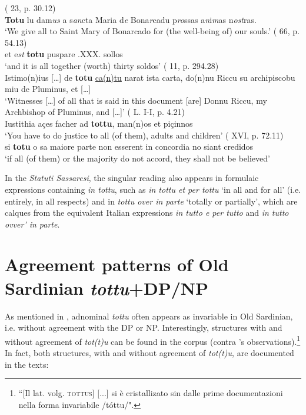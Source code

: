 \documentclass[output=paper,colorlinks,citecolor=brown]{langscibook}
\begin{document}
\ea\label{ex:men27}
\ea\label{ex:men27a}( 23, p. 30.12)\\
 \textbf{Totu} lu dam\textit{us} a s\textit{an}cta Maria d\textit{e} Bona\textit{r}cadu p\textit{ro}ssas a\textit{n}i\textit{m}as n\textit{ost}ras.\\
‘We give all to Saint Mary of Bonarcado for (the well-being of) our souls.’
\ex\label{ex:men27b}( 66, p. 54.13)\\
 et e\textit{st} \textbf{totu} puspare .XXX. sollos\\
‘and it is all together (worth)  thirty soldos’
\ex\label{ex:men27c}( 11, p. 294.28)\\
 Istimo(n)ius […] de \textbf{totu} \ul{ca(n)tu} narat ista carta, do(n)nu Riccu su archipiscobu miu de Pluminus, et […]\\
‘Witnesses […] of all that is said in this document [are] Donnu Riccu, my Archbishop of Pluminus, and […]’
\ex\label{ex:men27d}(  L. I-I, p.  4.21)\\
 Iustithia açes facher ad \textbf{tottu}, man(n)os et piçinnos\\
‘You have to do justice to all (of them), adults and children’
\ex\label{ex:men27e}( XVI, p. 72.11)\\
 si \textbf{totu} o sa maiore parte non esserent in concordia no siant credidos\\
‘if all (of them) or the majority do not accord, they shall not be believed’
\z
\z

In the \textit{Statuti Sassaresi}, the singular reading also appears in formulaic expressions containing \textit{in tottu}, such as \textit{in tottu et per tottu} ‘in all and for all’ (i.e. entirely, in all respects) and in \textit{tottu over in parte} ‘totally or partially’, which are calques from the equivalent Italian expressions \textit{in tutto e per tutto} and \textit{in tutto ovver’ in parte}. 


\section{Agreement patterns of Old Sardinian \textit{tottu}+DP/NP}\label{sec:men5}

As mentioned in , adnominal \textit{tottu} often appears as invariable in Old Sardinian, i.e. without agreement with the DP or NP. Interestingly, structures with and without agreement of \textit{tot(t)u} can be found in the corpus (contra \citeauthor{BlascoFerrer1984}'s \citeyear[][93]{BlascoFerrer1984} observations).\footnote{“[Il lat. volg. \textsc{tottus}] [...] si è cristallizato sin dalle prime documentazioni nella forma invariabile /tóttu/".} In fact, both structures, with and without agreement of \textit{tot(t)u}, are documented in the texts: \newpage
\end{document}
